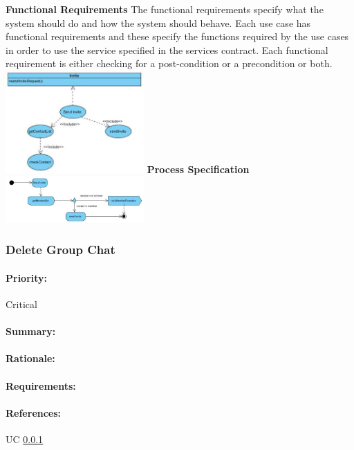 \documentclass[11pt]{article}
\begin{document}
\textbf{Functional Requirements}\newline
 The functional requirements specify what the system should do and how the system should behave. Each use case has functional requirements and these specify the functions required by the use cases in order to use the service specified in the services contract. Each functional requirement is either checking for a post-condition or a precondition or both.\newline
 \newline
\includegraphics[width=200px]{./images/FR-sendInvite.jpg}
 \newline
\textbf{Process Specification} \newline
 \newline
 \includegraphics[width=200px]{./images/process-sendInvite.jpg}
  \newline
 
\subsubsection{Delete Group Chat} \label{FR-delete-group}
\paragraph{Priority:}Critical
\paragraph{Summary:}
\paragraph{Rationale:}
\paragraph{Requirements:}
\paragraph{References:} UC \ref{FR-delete-group}
\end{document}
